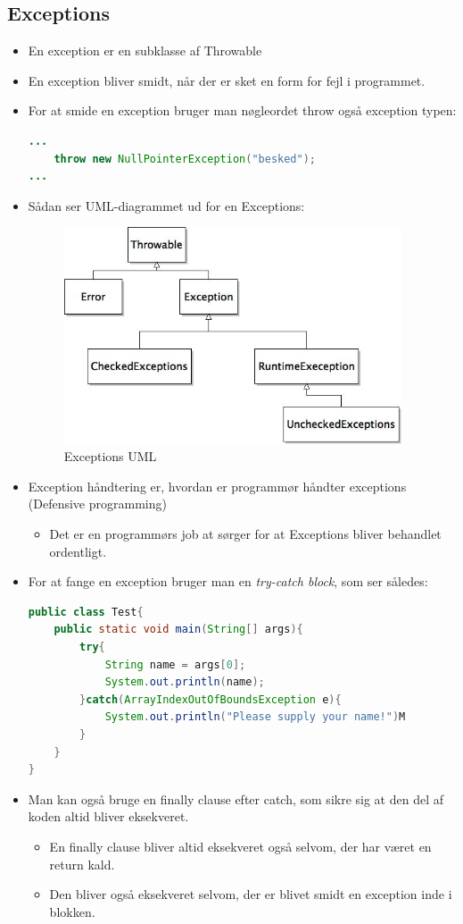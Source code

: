 \documentclass{article}
\begin{document}
\subsection{Exceptions}
\begin{itemize}
	\item En exception er en subklasse af Throwable
	\item En exception bliver smidt, når der er sket en form for fejl i programmet.
	\item For at smide en exception bruger man nøgleordet throw også exception typen:
\begin{lstlisting}[language=java]
...
	throw new NullPointerException("besked");
...
\end{lstlisting}
	\item Sådan ser UML-diagrammet ud for en Exceptions:
	\begin{figure}[ht!]
		\centering
		\includegraphics[width=100mm]{img/exceptionsUML.jpeg}
		\caption{Exceptions UML \label{UMLExceptions1}}
	\end{figure}
	\item Exception håndtering er, hvordan er programmør håndter exceptions (Defensive programming)
	\begin{itemize}
		\item Det er en programmørs job at sørger for at Exceptions bliver behandlet ordentligt. 
	\end{itemize}
	\item For at fange en exception bruger man en \textit{try-catch block}, som ser således:
\begin{lstlisting}[language=java]
public class Test{
	public static void main(String[] args){
		try{
			String name = args[0];
			System.out.println(name);
		}catch(ArrayIndexOutOfBoundsException e){
			System.out.println("Please supply your name!")M
		}
	}
}
\end{lstlisting}
	\item Man kan også bruge en finally clause efter catch, som sikre sig at den del af koden altid bliver eksekveret.
	\begin{itemize}
		\item En finally clause bliver altid eksekveret også selvom, der har været en return kald.
		\item Den bliver også eksekveret selvom, der er blivet smidt en exception inde i blokken. 
	\end{itemize}

\end{itemize}
\end{document}

